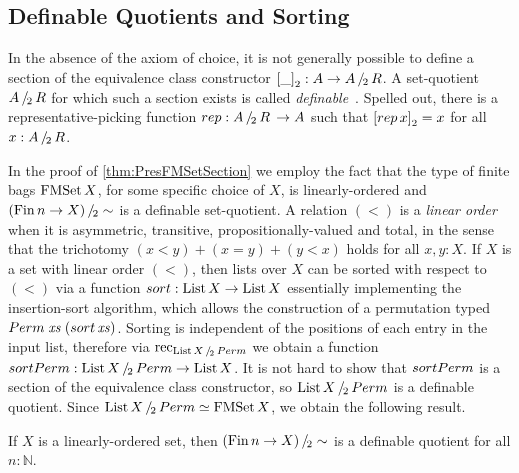 \documentclass[final,a4paper,USenglish,cleveref]{lipics-v2021}
\begin{document}
\subsection{Definable Quotients and Sorting}\label{sec:Sorting}

In the absence of the axiom of choice, it is not generally possible to define a section of the equivalence class constructor $\SetQuotCon[\Blank] : A \to \SetQuot[A][R]$.
A set-quotient $\SetQuot[A][R]$ for which such a section exists is called \emph{definable}~\cite{Li2015}.
Spelled out, there is a representative-picking function $\rep: \SetQuot[A][R] \, \to A$ such that $\SetQuotCon[\rep\,x] = x$ for all $x : \SetQuot[A][R]$.

In the proof of \cref{thm:PresFMSetSection} we employ the fact that the type of finite bags $\FMSet X$, for some specific choice of $X$, is linearly-ordered and $\SetQuot[(\Fin n \to X)][\sim]$ is a definable set-quotient.
A relation $(<)$ is a \emph{linear order} when it is asymmetric, transitive, propositionally-valued and total, in the sense that the trichotomy $(x < y) + (x = y) + (y < x)$ holds for all $x,y:X$.
If $X$ is a set with linear order $(<)$, then lists over $X$ can be sorted with respect to $(<)$ via a function $\sort : \List X \to \List X$ essentially implementing the insertion-sort algorithm, which allows the construction of a permutation typed $\Perm \;\Var{xs}\;(\sort\,\Var{xs})$. Sorting is independent of the positions of each entry in the input list, therefore via $\Rec{\SetQuot[\List X][\Perm]}$ we obtain a function $\sortPerm : \SetQuot[\List X][\Perm] \to \List X$. It is not hard to show that $\sortPerm$ is a section of the equivalence class constructor, so $\SetQuot[\List X][\Perm]$ is a definable quotient.
Since $\SetQuot[\List X][\Perm] \simeq \FMSet X$, we obtain the following result.
\begin{proposition}\label{prop:ListPermDefQuot}
If $X$ is a linearly-ordered set, then $\SetQuot[(\Fin n \to X)][\sim]$ is a definable quotient for all $n : ℕ$.
\end{proposition}
\end{document}
